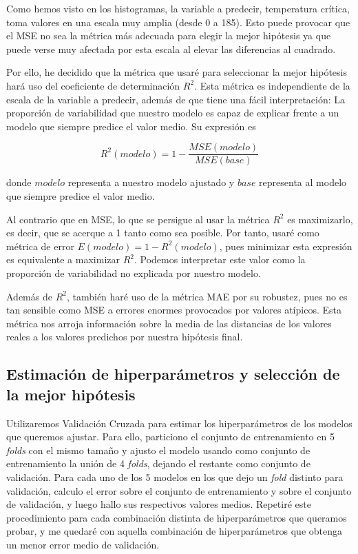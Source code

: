 \documentclass[10pt,a4paper]{article}
\begin{document}
Como hemos visto en los histogramas, la variable a predecir, temperatura crítica, toma valores en una escala muy amplia (desde 0 a 185). Esto puede provocar que el MSE no sea la métrica más adecuada para elegir la mejor hipótesis ya que puede verse muy afectada por esta escala al elevar las diferencias al cuadrado.

Por ello, he decidido que la métrica que usaré para seleccionar la mejor hipótesis hará uso del coeficiente de determinación $R^2$. Esta métrica es independiente de la escala de la variable a predecir, además de que tiene una fácil interpretación: La proporción de variabilidad que nuestro modelo es capaz de explicar frente a un modelo que siempre predice el valor medio. Su expresión es

$$R^2(modelo) = 1 - \frac{MSE(modelo)}{MSE(base)}$$

donde $modelo$ representa a nuestro modelo ajustado y $base$ representa al modelo que siempre predice el valor medio.

Al contrario que en MSE, lo que se persigue al usar la métrica $R^2$ es maximizarlo, es decir, que se acerque a 1 tanto como sea posible. Por tanto, usaré como métrica de error $E(modelo) = 1-R^2(modelo)$, pues minimizar esta expresión es equivalente a maximizar $R^2$. Podemos interpretar este valor como la proporción de variabilidad no explicada por nuestro modelo.

Además de $R^2$, también haré uso de la métrica MAE por su robustez, pues no es tan sensible como MSE a errores enormes provocados por valores atípicos. Esta métrica nos arroja información sobre la media de las distancias de los valores reales a los valores predichos por nuestra hipótesis final.





\subsection{Estimación de hiperparámetros y selección de la mejor hipótesis}

Utilizaremos Validación Cruzada para estimar los hiperparámetros de los modelos que queremos ajustar. Para ello, particiono el conjunto de entrenamiento en 5 \textit{folds} con el mismo tamaño y ajusto el modelo usando como conjunto de entrenamiento la unión de 4 \textit{folds}, dejando el restante como conjunto de validación. Para cada uno de los 5 modelos en los que dejo un \textit{fold} distinto para validación, calculo el error sobre el conjunto de entrenamiento y sobre el conjunto de validación, y luego hallo sus respectivos valores medios. Repetiré este procedimiento para cada combinación distinta de hiperparámetros que queramos probar, y me quedaré con aquella combinación de hiperparámetros que obtenga un menor error medio de validación.
\end{document}
